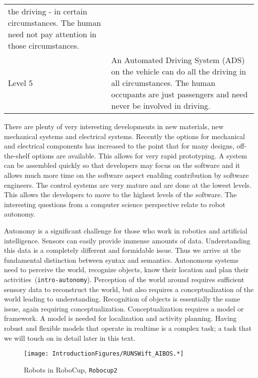 \begin{longtable}[]{@{}ll@{}}
\begin{minipage}[t]{0.91\columnwidth}
the driving - in certain circumstances. The human need not pay attention
in those circumstances.\strut
\end{minipage}\tabularnewline
\begin{minipage}[t]{0.03\columnwidth}\raggedright
Level 5\strut
\end{minipage} & \begin{minipage}[t]{0.91\columnwidth}\raggedright
An Automated Driving System (ADS) on the vehicle can do all the driving
in all circumstances. The human occupants are just passengers and need
never be involved in driving.\strut
\end{minipage}\tabularnewline
\bottomrule
\end{longtable}

There are plenty of very interesting developments in new materials, new
mechanical systems and electrical systems. Recently the options for
mechanical and electrical components has increased to the point that for
many designs, off-the-shelf options are available. This allows for very
rapid prototyping. A system can be assembled quickly so that developers
may focus on the software and it allows much more time on the software
aspect enabling contribution by software engineers. The control systems
are very mature and are done at the lowest levels. This allows the
developers to move to the highest levels of the software. The
interesting questions from a computer science perspective relate to
robot autonomy.

Autonomy is a significant challenge for those who work in robotics and
artificial intelligence. Sensors can easily provide immense amounts of
data. Understanding this data is a completely different and formidable
issue. Thus we arrive at the fundamental distinction between syntax and
semantics. Autonomous systems need to perceive the world, recognize
objects, know their location and plan their
activities~(\texttt{intro-autonomy}). Perception of the world around
requires sufficient sensory data to reconstruct the world, but also
requires a conceptualization of the world leading to understanding.
Recognition of objects is essentially the same issue, again requiring
conceptualization. Conceptualization requires a model or framework. A
model is needed for localization and activity planning. Having robust
and flexible models that operate in realtime is a complex task; a task
that we will touch on in detail later in this text.

\begin{figure}
\centering
\texttt{[image: IntroductionFigures/RUNSWift\_AIBOS.*]}
\caption{Robots in RoboCup, \texttt{Robocup2}}
\end{figure}


